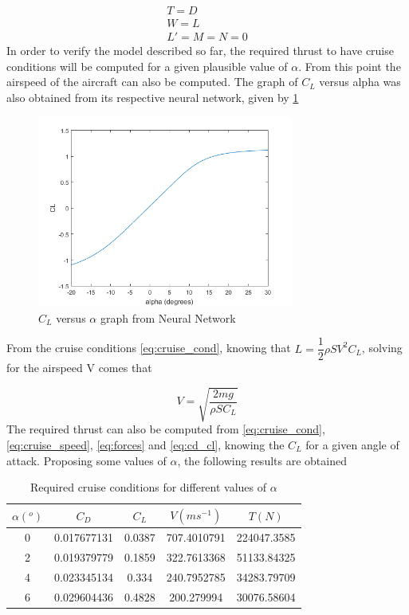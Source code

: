 \begin{gather}
	T=D\\
	W=L\\
	L'=M=N=0
\label{eq:cruise_cond}
\end{gather}
In order to verify the model described so far, the required thrust to have cruise conditions will be computed for a given plausible value of $\alpha$. From this point the airspeed of the aircraft can also be computed. The graph of $C_L$ versus alpha was also obtained from its respective neural network, given by \ref{fig:cl_alpha}
\begin{figure}[!htb]
  \centering
  \includegraphics[width=0.75\textwidth]{Figures/CL_alpha.png}
  \caption[$C_L$ versus $\alpha$ graph]{$C_L$ versus $\alpha$ graph from Neural Network}
  \label{fig:cl_alpha}
\end{figure}
From the cruise conditions \ref{eq:cruise_cond}, knowing that $L=\dfrac{1}{2}\rho S V^2 C_L$, solving for the airspeed V comes that

\begin{equation}
V=\sqrt{\dfrac{2mg}{\rho S C_L}}
\label{eq:cruise_speed}
\end{equation}
The required thrust can also be computed from \ref{eq:cruise_cond}, \ref{eq:cruise_speed}, \ref{eq:forces} and \ref{eq:cd_cl}, knowing the $C_L$ for a given angle of attack. Proposing some values of $\alpha$, the following results are obtained

\begin{table}[htbp]
  \centering
  \caption{Required cruise conditions for different values of $\alpha$}
    \begin{tabular}{ccccc}
    \toprule
    $\alpha (^o)$ & $C_D$ & $C_L$ & $V (ms^{-1})$ & $T (N)$ \\
    \midrule
    0     & 0.017677131 & 0.0387 & 707.4010791 & 224047.3585 \\
    2     & 0.019379779 & 0.1859 & 322.7613368 & 51133.84325 \\
    4     & 0.023345134 & 0.334 & 240.7952785 & 34283.79709 \\
    6     & 0.029604436 & 0.4828 & 200.279994 & 30076.58604 \\
    \bottomrule

    \end{tabular}
  \label{tab:cruise_cond}%
\end{table}%

